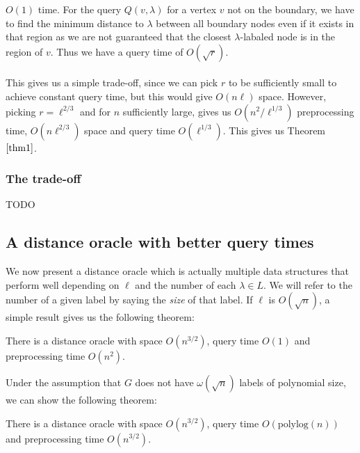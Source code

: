 $O(1)$ time. For the query $Q(v,\lambda)$ for a vertex $v$ not on the boundary, we have
to find the minimum distance to $\lambda$ between all boundary nodes even if it exists in
that region as we are not guaranteed that the closest $\lambda$-labaled node is in the
region of $v$. Thus we have a query time of $O(\sqrt{r})$. \\
\\
This gives us a simple trade-off, since we can pick $r$ to be sufficiently small to
achieve constant query time, but this would give $O(n\ell)$ space. However, picking
$r=\ell^{2/3}$ and for $n$ sufficiently large, gives us $O(n^2/\ell^{1/3})$ preprocessing time, $O(n\ell^{2/3})$ space and query time $O(\ell^{1/3})$. This gives us Theorem $\ref{thm1}$.

\subsubsection{The trade-off}
TODO

\subsection{A distance oracle with better query times}\label{oracle2}
We now present a distance oracle which is actually multiple data structures that perform
well depending on $\ell$ and the number of each $\lambda\in L$. We will refer to the
number of a given label by saying the \textit{size} of that label. If $\ell$ is
$O(\sqrt{n})$, a simple result gives us the following theorem:
\begin{thm}\label{thm4}
There is a distance oracle with space $O(n^{3/2})$, query time $O(1)$ and preprocessing
time $O(n^2)$.
\end{thm}
Under the assumption that $G$ does not have $\omega(\sqrt{n})$ labels of polynomial size, we can show the following theorem:
\begin{thm}\label{thm2}
  There is a distance oracle with space $O(n^{3/2})$, query time $O(\text{polylog}(n))$ and
  preprocessing time $O(n^{3/2})$.
\end{thm}

